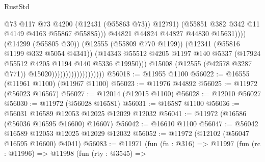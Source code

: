 \begin{lexlean}{RustStd}
\begin{coremodule}
                                                          @73
                                                          @117
                                                          @73
                                                          @4200
                                                          (@12431 (@55863 @73))
                                                          @12791)
                                                        (@55851
                                                          @382
                                                          @342
                                                          @11
                                                          @4149
                                                          @4163
                                                          @55867
                                                          @55885)))
                                                    @44821
                                                    @44824
                                                    @44827
                                                    @44830
                                                    @15631))))
                                            (@14299 (@55805 @30))
                                            (@12555 (@55809 @770 @1199))
                                            (@12341 (@55816 @1199 @332 @5054 @4341))
                                            (@14343
                                              @55512
                                              @4205
                                              @1197
                                              @140
                                              @5337
                                              (@17924 @55512 @4205 @1194 @140 @5336 @19950)))
                                          @15008
                                          (@12555 (@42578 @3287 @771))
                                          @15020)))))))))))))))))))
@56018 := @11955 @1100
@56022 := @16555 (@11961 @1100) (@11967 @1100)
@56023 := @11976 @44892
@56025 := @11972 (@56023 @16567)
@56027 := @12014 (@12015 @1100)
@56028 := @12010 @56027
@56030 := @11972 (@56028 @16581)
@56031 := @16587 @1100
@56036 := @56031 @16589 @12053 @12025 @12029 @12032
@56041 := @11972 (@16586 (@56036 @16595 @16600) @16607)
@56042 := @16610 @1100
@56047 := @56042 @16589 @12053 @12025 @12029 @12032
@56052 := @11972 (@12102 (@56047 @16595 @16600) @4041)
@56083 := @11971
    (fun (fn : @316) =>
    @11997
      (fun (rc : @11996) =>
      @11998
        (fun (rty : @3545) =>

\end{coremodule}
\end{lexlean}
